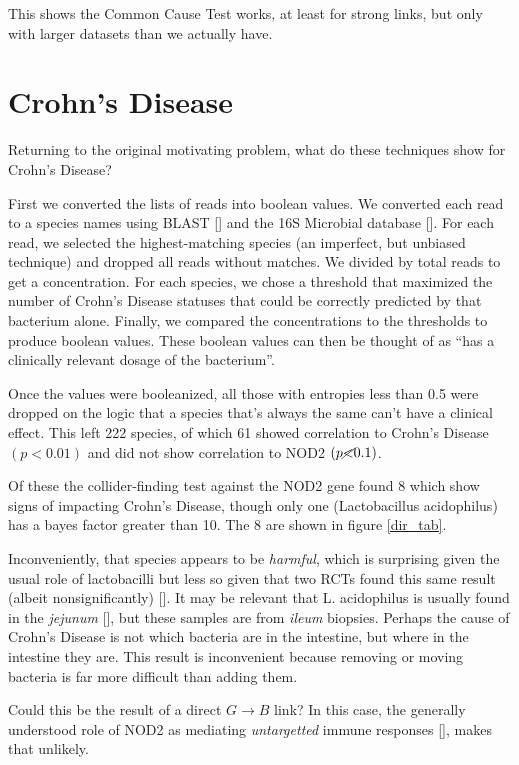 \documentclass[letterpaper]{article}
\begin{document}
This shows the Common Cause Test works, at least for strong links, but
only with larger datasets than we actually have.




\section{Crohn's Disease}

Returning to the original motivating problem, what do these techniques
show for Crohn's Disease?

First we converted the lists of reads into boolean
values.  We converted each read to a species names using BLAST [\cite{BLAST}]
and the 16S Microbial database [\cite{16S}].  For each read, we
selected the highest-matching species (an imperfect, but unbiased
technique) and dropped all reads without matches.  We divided by total
reads to get a concentration.  For each species, we chose a threshold that
maximized the number of Crohn's Disease statuses that could be
correctly predicted by that bacterium alone.  Finally, we compared the
concentrations to the thresholds to produce boolean values. These
boolean values can then be thought of as ``has a clinically relevant
dosage of the bacterium''.

Once the values were booleanized, all those with
entropies less than 0.5 were dropped on the logic that a species
that's always the same can't have a clinical effect.  This left 222
species, of which 61 showed correlation to Crohn's Disease $(p<0.01)$
and did not show correlation to NOD2 $(p\cancel{<}0.1)$.

Of these the collider-finding test against the NOD2 gene found 8 which
show signs of impacting
Crohn's Disease, though only one (Lactobacillus acidophilus) has a
bayes factor greater than 10.  The 8 are shown in figure \ref{dir_tab}.

Inconveniently, that species appears to
be \textit{harmful}, which is surprising given the usual role of
lactobacilli but less so given that two RCTs found this same result
(albeit nonsignificantly) [\cite{lgg1,lgg2}].  It may be relevant that
L. acidophilus is usually found in the
\textit{jejunum} [\cite{lacid}], but these samples are from
\textit{ileum} biopsies.  Perhaps the cause of Crohn's Disease is not
which bacteria are in the intestine, but where in the intestine they
are.  This result is inconvenient because removing or moving bacteria
is far more difficult than adding them.

Could this be the result of a direct $G\rightarrow B$ link?  In this
case, the generally
understood role of NOD2 as mediating \textit{untargetted} immune
responses [\cite{nod2}], makes that unlikely.
\end{document}
